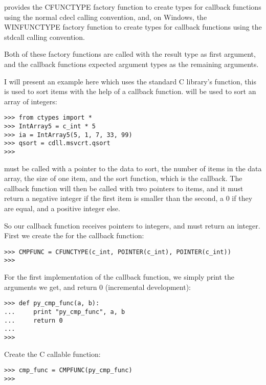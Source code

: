 provides the CFUNCTYPE factory function to create types for
callback functions using the normal cdecl calling convention, and, on
Windows, the WINFUNCTYPE factory function to create types for callback
functions using the stdcall calling convention.

Both of these factory functions are called with the result type as
first argument, and the callback functions expected argument types as
the remaining arguments.

I will present an example here which uses the standard C library's
 function, this is used to sort items with the help of a
callback function.  will be used to sort an array of
integers:
\begin{verbatim}
>>> from ctypes import *
>>> IntArray5 = c_int * 5
>>> ia = IntArray5(5, 1, 7, 33, 99)
>>> qsort = cdll.msvcrt.qsort
>>>
\end{verbatim}

 must be called with a pointer to the data to sort, the
number of items in the data array, the size of one item, and the sort
function, which is the callback. The callback function will then be
called with two pointers to items, and it must return a negative
integer if the first item is smaller than the second, a 0 if they are
equal, and a positive integer else.

So our callback function receives pointers to integers, and must
return an integer. First we create the  for the callback
function:
\begin{verbatim}
>>> CMPFUNC = CFUNCTYPE(c_int, POINTER(c_int), POINTER(c_int))
>>>
\end{verbatim}

For the first implementation of the callback function, we simply print
the arguments we get, and return 0 (incremental development):
\begin{verbatim}
>>> def py_cmp_func(a, b):
...     print "py_cmp_func", a, b
...     return 0
...
>>>
\end{verbatim}

Create the C callable function:
\begin{verbatim}
>>> cmp_func = CMPFUNC(py_cmp_func)
>>>
\end{verbatim}

